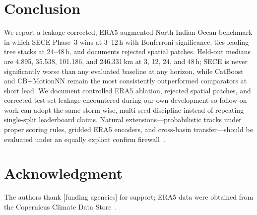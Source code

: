 \documentclass[conference]{IEEEtran}
\newcommand{\sece}{SECE}
\newcommand{\era}{ERA5}
\begin{document}
\section{Conclusion}
We report a leakage-corrected, \era{}-augmented North Indian Ocean benchmark in
which \sece{} Phase~3 wins at 3--12\,h with Bonferroni significance, ties leading
tree stacks at 24--48\,h, and documents rejected spatial patches. Held-out medians
are 4.895, 35.538, 101.186, and 246.331\,km at 3, 12, 24, and 48\,h; \sece{} is
never significantly worse than any evaluated baseline at any horizon, while
CatBoost and CB+MotionNN remain the most consistently outperformed comparators at
short lead. We document controlled \era{} ablation, rejected spatial patches, and
corrected test-set leakage encountered during our own development so follow-on work
can adopt the same storm-wise, multi-seed discipline instead of repeating
single-split leaderboard claims. Natural extensions---probabilistic tracks under
proper scoring rules, gridded \era{} encoders, and cross-basin transfer---should
be evaluated under an equally explicit confirm firewall~\cite{gneiting2007,cawley2010}.

\section*{Acknowledgment}
The authors thank [funding agencies] for support; \era{} data were obtained from
the Copernicus Climate Data Store~\cite{hersbach2023era5}.
\end{document}

